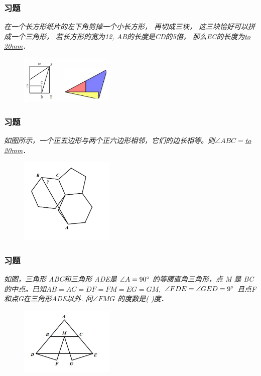 \begin{frame}
    \frametitle{习题\theframecounter}
    \vspace*{-1cm}
    \textit{在一个长方形纸片的左下角剪掉一个小长方形，
    再切成三块， 这三块恰好可以拼成一个三角形，
    若长方形的宽为12, AB的长度是CD的5倍，
    那么EC的长度为\underline{\hbox to 20mm{}}．} 
    \begin{figure}[H] 
        \centering
        \includegraphics[width=0.4\textwidth]{./pics/Chapter_3/6.png}
    \end{figure}
\end{frame}

\begin{frame}
    \frametitle{习题\theframecounter}
    \vspace*{-1cm}
    \textit{如图所示，一个正五边形与两个正六边形相邻，它们的边长相等。则$\angle ABC = $\underline{\hbox to 20mm{}}．} 
    \begin{figure}[H] 
        \centering
        \includegraphics[width=0.4\textwidth]{./pics/Chapter_3/7.png}
    \end{figure}
\end{frame}

\begin{frame}
    \frametitle{习题\theframecounter}
    \vspace*{-1cm}
    \textit{如图，三角形 ABC和三角形 ADE是 $\angle A=90\degree$ 的等腰直角三角形，点 M 是 BC 的中点。已知$AB=AC=DF=FM=EG=GM, $ $\angle FDE = \angle GED=9\degree$ 且点F和点G在三角形ADE以外. 问$\angle FMG$ 的度数是( )度．} 
    \begin{figure}[H] 
        \centering
        \includegraphics[width=0.4\textwidth]{./pics/Chapter_3/8.png}
    \end{figure}
\end{frame}

